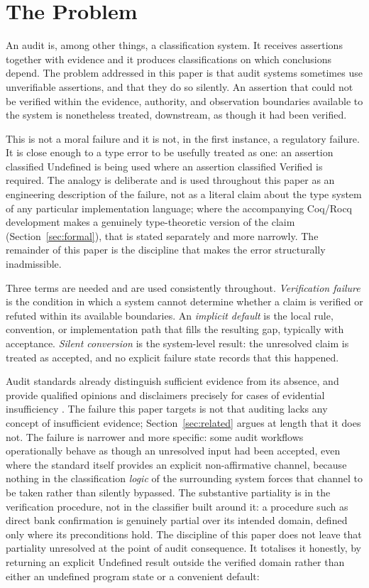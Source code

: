 \documentclass[smallcondensed,envcountsect,natbib]{svjour3}
\newcommand{\state}[1]{\textsf{#1}}
\begin{document}
\section{The Problem}
\label{sec:problem}

An audit is, among other things, a classification system. It receives assertions together with evidence and it produces classifications on which conclusions depend. The problem addressed in this paper is that audit systems sometimes use unverifiable assertions, and that they do so silently. An assertion that could not be verified within the evidence, authority, and observation boundaries available to the system is nonetheless treated, downstream, as though it had been verified.

This is not a moral failure and it is not, in the first instance, a regulatory failure. It is close enough to a type error to be usefully treated as one: an assertion classified \state{Undefined} is being used where an assertion classified \state{Verified} is required. The analogy is deliberate and is used throughout this paper as an engineering description of the failure, not as a literal claim about the type system of any particular implementation language; where the accompanying Coq/Rocq development makes a genuinely type-theoretic version of the claim (Section~\ref{sec:formal}), that is stated separately and more narrowly. The remainder of this paper is the discipline that makes the error structurally inadmissible.

Three terms are needed and are used consistently throughout. \emph{Verification failure} is the condition in which a system cannot determine whether a claim is verified or refuted within its available boundaries. An \emph{implicit default} is the local rule, convention, or implementation path that fills the resulting gap, typically with acceptance. \emph{Silent conversion} is the system-level result: the unresolved claim is treated as accepted, and no explicit failure state records that this happened.

Audit standards already distinguish sufficient evidence from its absence, and provide qualified opinions and disclaimers precisely for cases of evidential insufficiency \citep{isa500, isa705}. The failure this paper targets is not that auditing lacks any concept of insufficient evidence; Section~\ref{sec:related} argues at length that it does not. The failure is narrower and more specific: some audit workflows operationally behave as though an unresolved input had been accepted, even where the standard itself provides an explicit non-affirmative channel, because nothing in the classification \emph{logic} of the surrounding system forces that channel to be taken rather than silently bypassed. The substantive partiality is in the verification procedure, not in the classifier built around it: a procedure such as direct bank confirmation is genuinely partial over its intended domain, defined only where its preconditions hold. The discipline of this paper does not leave that partiality unresolved at the point of audit consequence. It totalises it honestly, by returning an explicit \state{Undefined} result outside the verified domain rather than either an undefined program state or a convenient default:
\end{document}
